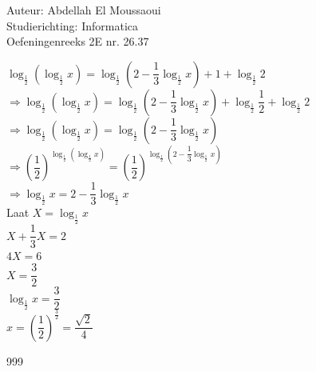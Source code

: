 \documentclass[a4paper]{article}
\begin{document}
  
\noindent \large Auteur: Abdellah El Moussaoui \\
\noindent \large Studierichting: Informatica\\
\noindent \large Oefeningenreeks 2E nr. 26.37\\

\medskip

\normalsize

$\log_{\tfrac{1}{2}}\left(\log_{\tfrac{1}{2}}x\right)=\log_{\tfrac{1}{2}}\left(2-\dfrac{1}{3}\log_{\tfrac{1}{2}}x\right)+1+\log_{\tfrac{1}{2}}2$\\

$\Rightarrow \log_{\tfrac{1}{2}}\left(\log_{\tfrac{1}{2}}x\right)=\log_{\tfrac{1}{2}}\left(2-\dfrac{1}{3}\log_{\tfrac{1}{2}}x\right)+\log_{\tfrac{1}{2}}\dfrac{1}{2}+\log_{\tfrac{1}{2}}2$\\

$\Rightarrow \log_{\tfrac{1}{2}}\left(\log_{\tfrac{1}{2}}x\right)=\log_{\tfrac{1}{2}}\left(2-\dfrac{1}{3}\log_{\tfrac{1}{2}}x\right)$\\

$\Rightarrow \left(\dfrac{1}{2}\right)^{\log_{\tfrac{1}{2}}\left(\log_{\tfrac{1}{2}}x\right)}=\left(\dfrac{1}{2}\right)^{\log_{\tfrac{1}{2}}\left(2-\dfrac{1}{3}\log_{\tfrac{1}{2}}x\right)}$\\


$\Rightarrow \log_{\tfrac{1}{2}}x = 2-\dfrac{1}{3}\log_{\tfrac{1}{2}}x$\\

Laat $X = \log_{\tfrac{1}{2}}x$\\

$X + \dfrac{1}{3}X=2$\\

$4X=6$\\

$X=\dfrac{3}{2}$\\

$\log_{\tfrac{1}{2}}x=\dfrac{3}{2}$\\

$x=\left(\dfrac{1}{2}\right)^{\tfrac{3}{2}} = \dfrac{\sqrt{2}}{4}$\\



\begin{thebibliography}{999}
\end{thebibliography}
\end{document}
